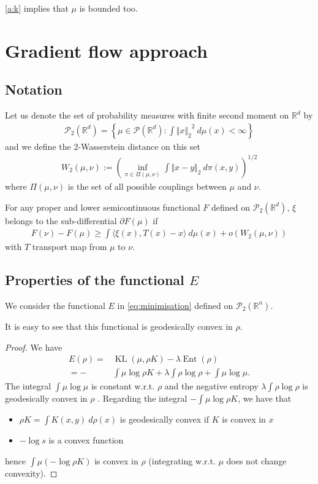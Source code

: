 \documentclass[a4paper]{article}
\theoremstyle{definition}
\DeclareMathOperator{\KL}{KL}
\DeclareMathOperator{\ent}{Ent}
\newcommand{\norm}[2]{\ensuremath{\Vert #1 \Vert_{#2}}}
\def\real{\mathbb{R}}
\begin{document}
\ref{a:k} implies that $\mu$ is bounded too.
\section{Gradient flow approach}
\subsection{Notation}

Let us denote the set of probability measures with finite second moment on $\real^d$ by
\begin{align*}
\mathcal{P}_2(\real^d) = \left\lbrace \mu\in \mathcal{P}(\real^d): \int \norm{ x}{2}^2 \ d\mu(x)< \infty\right\rbrace
\end{align*}
and we define the 2-Wasserstein distance on this set
\begin{align*}
W_2(\mu, \nu) := \left( \inf_{\pi\in\Pi(\mu, \nu)}\int\norm{x - y}{2}\ d\pi(x, y)\right)^{1/2}
\end{align*}
where $\Pi(\mu, \nu)$ is the set of all possible couplings between $\mu$ and $\nu$.



For any proper and lower semicontinuous functional $F$ defined on $\mathcal{P}_2(\real^d)$, $\xi$ belongs to the sub-differential $\partial F(\mu)$ if
\begin{align*}
F(\nu) - F(\mu) \geq \int\langle \xi(x), T(x) - x\rangle\ d\mu(x) +o\left( W_2(\mu, \nu)\right)
\end{align*}
with $T$ transport map from $\mu$ to $\nu$.

\subsection{Properties of the functional $E$}

We consider the functional $E$ in \eqref{eq:minimisation} defined on $\mathcal{P}_2(\real^n)$.

It is easy to see that this functional is geodesically convex in $\rho$.
\begin{proof}
We have
\begin{align*}
E(\rho)= & \KL(\mu,\rho K)-\lambda\ent(\rho)\\
=- & \int\mu\log\rho K+\lambda\int\rho\log\rho+\int\mu\log\mu.
\end{align*}
The integral $\int\mu\log\mu$ is constant w.r.t. $\rho$ and the negative entropy $\lambda\int\rho\log\rho$ is geodesically convex in $\rho$ \citep[page 130]{santambrogio2017euclidean}.
Regarding the integral $- \int\mu\log\rho K$, we have that
\begin{itemize}
\item $\rho K = \int K(x, y) \ d\rho(x)$ is geodesically convex if $K$ is convex in $x$ \citep[page 128]{santambrogio2017euclidean}
\item $-\log s$ is a convex function
\end{itemize}
hence $\int\mu\left( -\log\rho K\right)$ is convex in $\rho$ (integrating w.r.t. $\mu$ does not change convexity).
\end{proof}
\end{document}

